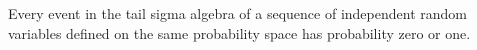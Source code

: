 


\begin{prop}
Every event in the tail sigma algebra
of a sequence of independent random variables
defined on the same probability space
has probability zero or one.
\end{prop}
